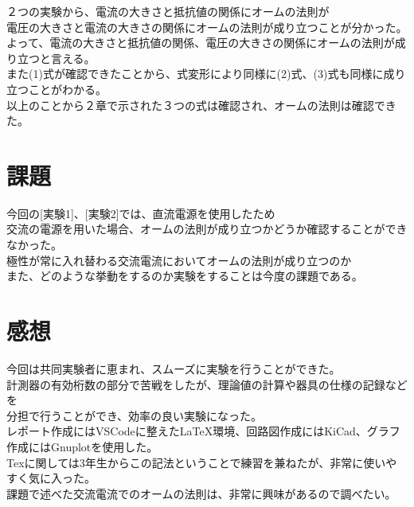 \documentclass[titlepage]{jarticle}
\begin{document}
２つの実験から、電流の大きさと抵抗値の関係にオームの法則が\\
電圧の大きさと電流の大きさの関係にオームの法則が成り立つことが分かった。\\
よって、電流の大きさと抵抗値の関係、電圧の大きさの関係にオームの法則が成り立つと言える。\\
また(1)式が確認できたことから、式変形により同様に(2)式、(3)式も同様に成り立つことがわかる。\\
以上のことから２章で示された３つの式は確認され、オームの法則は確認できた。

\section{課題}
今回の[実験1]、[実験2]では、直流電源を使用したため\\
交流の電源を用いた場合、オームの法則が成り立つかどうか確認することができなかった。\\
極性が常に入れ替わる交流電流においてオームの法則が成り立つのか\\
また、どのような挙動をするのか実験をすることは今度の課題である。

\section{感想}
今回は共同実験者に恵まれ、スムーズに実験を行うことができた。\\
計測器の有効桁数の部分で苦戦をしたが、理論値の計算や器具の仕様の記録などを\\
分担で行うことができ、効率の良い実験になった。\\
レポート作成にはVSCodeに整えたLaTeX環境、回路図作成にはKiCad、グラフ作成にはGnuplotを使用した。\\
Texに関しては3年生からこの記法ということで練習を兼ねたが、非常に使いやすく気に入った。\\
課題で述べた交流電流でのオームの法則は、非常に興味があるので調べたい。\\
\end{document}

